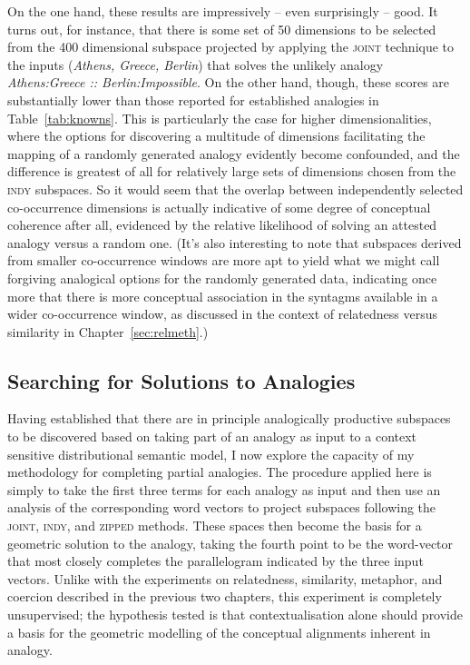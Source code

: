 On the one hand, these results are impressively -- even surprisingly -- good.  It turns out, for instance, that there is some set of 50 dimensions to be selected from the 400 dimensional subspace projected by applying the \textsc{joint} technique to the inputs (\emph{Athens, Greece, Berlin}) that solves the unlikely analogy \emph{Athens:Greece :: Berlin:Impossible}.  On the other hand, though, these scores are substantially lower than those reported for established analogies in Table~\ref{tab:knowns}.  This is particularly the case for higher dimensionalities, where the options for discovering a multitude of dimensions facilitating the mapping of a randomly generated analogy evidently become confounded, and the difference is greatest of all for relatively large sets of dimensions chosen from the \textsc{indy} subspaces.  So it would seem that the overlap between independently selected co-occurrence dimensions is actually indicative of some degree of conceptual coherence after all, evidenced by the relative likelihood of solving an attested analogy versus a random one.  (It's also interesting to note that subspaces derived from smaller co-occurrence windows are more apt to yield what we might call forgiving analogical options for the randomly generated data, indicating once more that there is more conceptual association in the syntagms available in a wider co-occurrence window, as discussed in the context of relatedness versus similarity in Chapter~\ref{sec:relmeth}.)

\subsection{Searching for Solutions to Analogies}
Having established that there are in principle analogically productive subspaces to be discovered based on taking part of an analogy as input to a context sensitive distributional semantic model, I now explore the capacity of my methodology for completing partial analogies.  The procedure applied here is simply to take the first three terms for each analogy as input and then use an analysis of the corresponding word vectors to project subspaces following the \textsc{joint}, \textsc{indy}, and \textsc{zipped} methods.  These spaces then become the basis for a geometric solution to the analogy, taking the fourth point to be the word-vector that most closely completes the parallelogram indicated by the three input vectors.  Unlike with the experiments on relatedness, similarity, metaphor, and coercion described in the previous two chapters, this experiment is completely unsupervised; the hypothesis tested is that contextualisation alone should provide a basis for the geometric modelling of the conceptual alignments inherent in analogy.

